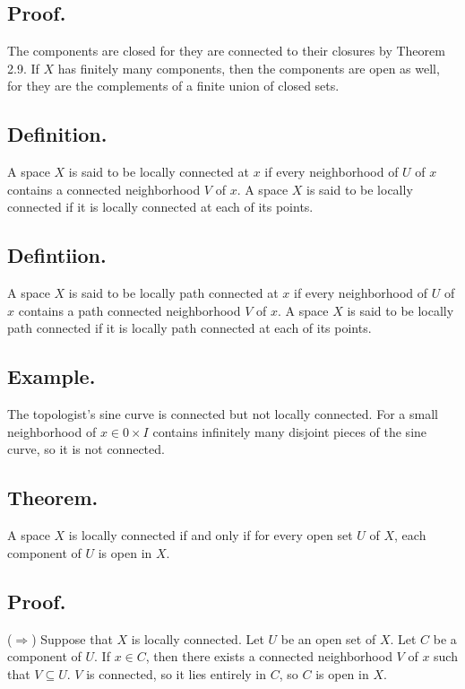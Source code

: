 \documentclass[titlepage]{article}
\begin{document}
\subsection{Proof.} The components are closed for they are connected to their closures by Theorem 2.9. If $X$ has finitely many components, then the components are open as well, for they are the complements of a finite union of closed sets.

\subsection{Definition.} A space $X$ is said to be locally connected at $x$ if every neighborhood of $U$ of $x$ contains a connected neighborhood $V$ of $x$. A space $X$ is said to be locally connected if it is locally connected at each of its points.

\subsection{Defintiion.} A space $X$ is said to be locally path connected at $x$ if every neighborhood of $U$ of $x$ contains a path connected neighborhood $V$ of $x$. A space $X$ is said to be locally path connected if it is locally path connected at each of its points.

\subsection{Example.} The topologist's sine curve is connected but not locally connected. For a small neighborhood of $x \in 0 \times I$ contains infinitely many disjoint pieces of the sine curve, so it is not connected.

\subsection{Theorem.} A space $X$ is locally connected if and only if for every open set $U$ of $X$, each component of $U$ is open in $X$.

\subsection{Proof.}

($\Rightarrow$) Suppose that $X$ is locally connected. Let $U$ be an open set of $X$. Let $C$ be a component of $U$. If $x \in C$, then there exists a connected neighborhood $V$ of $x$ such that $V \subseteq U$. $V$ is connected, so it lies entirely in $C$, so $C$ is open in $X$.
\end{document}
